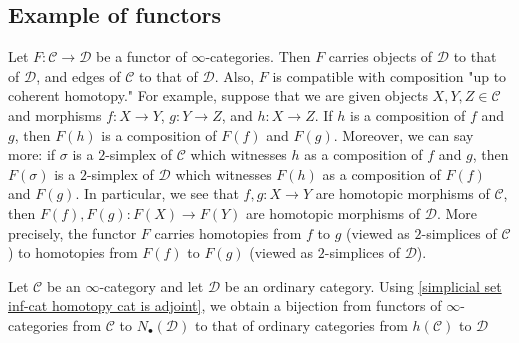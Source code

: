 \subsection{Example of functors}
Let $F:\mathcal{C}\to\mathcal{D}$ be a functor of $\infty$-categories. Then $F$ carries objects of $\mathcal{D}$ to that of $\mathcal{D}$, and edges of $\mathcal{C}$ to that of $\mathcal{D}$. Also, $F$ is compatible with composition "up to coherent homotopy." For example, suppose that we are given objects $X,Y,Z\in\mathcal{C}$ and morphisms $f:X\to Y$, $g:Y\to Z$, and $h:X\to Z$. If $h$ is a composition of $f$ and $g$, then $F(h)$ is a composition of $F(f)$ and $F(g)$. Moreover, we can say more: if $\sigma$ is a $2$-simplex of $\mathcal{C}$ which witnesses $h$ as a composition of $f$ and $g$, then $F(\sigma)$ is a $2$-simplex of $\mathcal{D}$ which witnesses $F(h)$ as a composition of $F(f)$ and $F(g)$. In particular, we see that $f,g:X\to Y$ are homotopic morphisms of $\mathcal{C}$, then $F(f),F(g):F(X)\to F(Y)$ are homotopic morphisms of $\mathcal{D}$. More precisely, the functor $F$ carries homotopies from $f$ to $g$ (viewed as $2$-simplices of $\mathcal{C}$) to homotopies from $F(f)$ to $F(g)$ (viewed as $2$-simplices of $\mathcal{D}$).
\begin{example}
Let $\mathcal{C}$ be an $\infty$-category and let $\mathcal{D}$ be an ordinary category. Using \cref{simplicial set inf-cat homotopy cat is adjoint}, we obtain a bijection from functors of $\infty$-categories from $\mathcal{C}$ to $N_\bullet(\mathcal{D})$ to that of ordinary categories from $h(\mathcal{C})$ to $\mathcal{D}$
\end{example}
